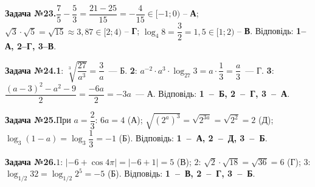 \documentclass[12pt]{article}
\begin{document}
\begin{tcolorbox}[colback=titleBg!40, colframe=mainGreen!55, boxrule=0.4pt, arc=2pt, left=6pt, right=6pt, top=4pt, bottom=4pt, breakable]
\noindent\small\textbf{Задача №23.}\quad $\dfrac{7}{5}-\dfrac{5}{3}=\dfrac{21-25}{15}=-\dfrac{4}{15}\in[-1;0)$ -- \textbf{А}; $\sqrt{3}\cdot\sqrt{5}=\sqrt{15}\approx3{,}87\in[2;4)$ -- \textbf{Г}; $\log_4 8=\dfrac{3}{2}=1{,}5\in[1;2)$ -- \textbf{В}. Відповідь: \textbf{1--А, 2--Г, 3--В}.
\par\vspace{0.1cm}\hfill\hyperlink{task:23}{}
\end{tcolorbox}
\par\vspace{0.3cm}\noindent\hypertarget{sol:24}{}
\begin{tcolorbox}[colback=titleBg!40, colframe=mainGreen!55, boxrule=0.4pt, arc=2pt, left=6pt, right=6pt, top=4pt, bottom=4pt, breakable]
\noindent\small\textbf{Задача №24.}\quad \textbf{1}: $\sqrt[3]{\dfrac{27}{a^3}} = \dfrac{3}{a}$~--- Б. \textbf{2}: $a^{-2}\cdot a^3\cdot\log_{27}3 = a\cdot\dfrac13 = \dfrac{a}{3}$~--- Г. \textbf{3}: $\dfrac{(a-3)^2 - a^2 - 9}{2} = \dfrac{-6a}{2} = -3a$~--- А. Відповідь: \textbf{1~--~Б, 2~--~Г, 3~--~А}.
\par\vspace{0.1cm}\hfill\hyperlink{task:24}{}
\end{tcolorbox}
\par\vspace{0.3cm}\noindent\hypertarget{sol:25}{}
\begin{tcolorbox}[colback=titleBg!40, colframe=mainGreen!55, boxrule=0.4pt, arc=2pt, left=6pt, right=6pt, top=4pt, bottom=4pt, breakable]
\noindent\small\textbf{Задача №25.}\quad При $a=\dfrac{2}{3}$: $6a=4$ (А); $\sqrt{(2^a)^3}=\sqrt{2^{3a}}=\sqrt{2^2}=2$ (Д); $\log_3(1-a)=\log_3\dfrac{1}{3}=-1$ (Б). Відповідь: \textbf{1~--~А, 2~--~Д, 3~--~Б}.
\par\vspace{0.1cm}\hfill\hyperlink{task:25}{}
\end{tcolorbox}
\par\vspace{0.3cm}\noindent\hypertarget{sol:26}{}
\begin{tcolorbox}[colback=titleBg!40, colframe=mainGreen!55, boxrule=0.4pt, arc=2pt, left=6pt, right=6pt, top=4pt, bottom=4pt, breakable]
\noindent\small\textbf{Задача №26.}\quad $1$: $|-6+\cos4\pi|=|-6+1|=5$ (В); $2$: $\sqrt{2}\cdot\sqrt{18}=\sqrt{36}=6$ (Г); $3$: $\log_{1/2}32=\log_{1/2}2^5=-5$ (Б). Відповідь: \textbf{1~--~В, 2~--~Г, 3~--~Б}.
\par\vspace{0.1cm}\hfill\hyperlink{task:26}{}
\end{tcolorbox}
\end{document}
